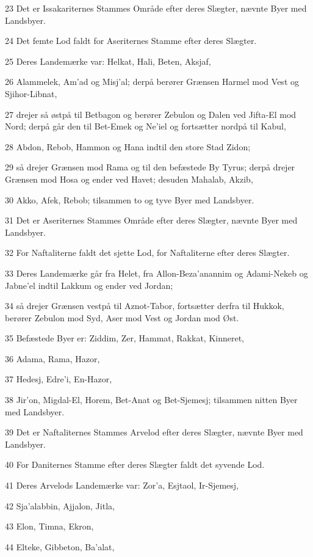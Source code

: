 \par 23 Det er Issakariternes Stammes Område efter deres Slægter, nævnte Byer med Landsbyer.
\par 24 Det femte Lod faldt for Aseriternes Stamme efter deres Slægter.
\par 25 Deres Landemærke var: Helkat, Hali, Beten, Aksjaf,
\par 26 Alammelek, Am'ad og Misj'al; derpå berører Grænsen Harmel mod Vest og Sjihor-Libnat,
\par 27 drejer så østpå til Betbagon og berører Zebulon og Dalen ved Jifta-El mod Nord; derpå går den til Bet-Emek og Ne'iel og fortsætter nordpå til Kabul,
\par 28 Abdon, Rebob, Hammon og Hana indtil den store Stad Zidon;
\par 29 så drejer Grænsen mod Rama og til den befæstede By Tyrus; derpå drejer Grænsen mod Hosa og ender ved Havet; desuden Mahalab, Akzib,
\par 30 Akko, Afek, Rebob; tilsammen to og tyve Byer med Landsbyer.
\par 31 Det er Aseriternes Stammes Område efter deres Slægter, nævnte Byer med Landsbyer.
\par 32 For Naftaliterne faldt det sjette Lod, for Naftaliterne efter deres Slægter.
\par 33 Deres Landemærke går fra Helet, fra Allon-Beza'anannim og Adami-Nekeb og Jabne'el indtil Lakkum og ender ved Jordan;
\par 34 så drejer Grænsen vestpå til Aznot-Tabor, fortsætter derfra til Hukkok, berører Zebulon mod Syd, Aser mod Vest og Jordan mod Øst.
\par 35 Befæstede Byer er: Ziddim, Zer, Hammat, Rakkat, Kinneret,
\par 36 Adama, Rama, Hazor,
\par 37 Hedesj, Edre'i, En-Hazor,
\par 38 Jir'on, Migdal-El, Horem, Bet-Anat og Bet-Sjemesj; tilsammen nitten Byer med Landsbyer.
\par 39 Det er Naftaliternes Stammes Arvelod efter deres Slægter, nævnte Byer med Landsbyer.
\par 40 For Daniternes Stamme efter deres Slægter faldt det syvende Lod.
\par 41 Deres Arvelods Landemærke var: Zor'a, Esjtaol, Ir-Sjemesj,
\par 42 Sja'alabbin, Ajjalon, Jitla,
\par 43 Elon, Timna, Ekron,
\par 44 Elteke, Gibbeton, Ba'alat,
